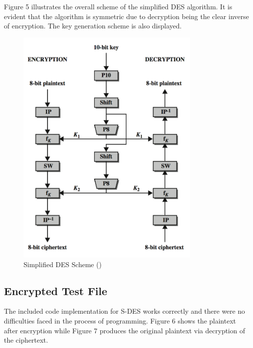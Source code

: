 \documentclass[]{article}
\begin{document}
\newpage
\noindent
Figure 5 illustrates the overall scheme of the simplified DES algorithm. It is evident that the algorithm is symmetric due to decryption being the clear inverse of encryption. The key generation scheme is also displayed.

\begin{figure}[H]
	\begin{center}
		\includegraphics[height=0.8\textheight,width=0.8\textwidth]{sdes_scheme.png}
		\caption{Simplified DES Scheme (\cite{maintext})}
		\label{fig:des_scheme}		
	\end{center}
\end{figure}

\newpage
\subsection*{Encrypted Test File}

The included code implementation for S-DES works correctly and there were no difficulties faced in the process of programming. Figure 6 shows the plaintext after encryption while Figure 7 produces the original plaintext via decryption of the ciphertext.
\end{document}
